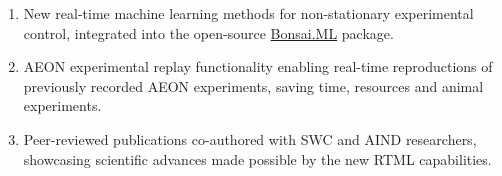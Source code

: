 
\begin{enumerate}

	\item New real-time machine learning methods for non-stationary
	experimental control, integrated into the open-source
	\href{https://bonsai-rx.org/machinelearning/}{Bonsai.ML} package.

	\item AEON experimental replay functionality enabling real-time
	reproductions of previously recorded AEON experiments, saving time,
	resources and animal experiments.

	\item Peer-reviewed publications co-authored with SWC and AIND researchers,
	showcasing scientific advances made possible by the new RTML capabilities.

\end{enumerate}

